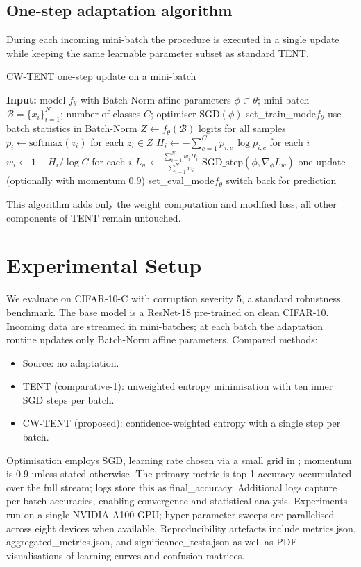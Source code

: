 \documentclass{article} %
\begin{document}
\subsection{One-step adaptation algorithm}
During each incoming mini-batch the procedure is executed in a single update while keeping the same learnable parameter subset as standard TENT.
\begin{algorithm}
\caption{CW-TENT one-step update on a mini-batch}
\begin{algorithmic}[1]
\State \textbf{Input:} model \(f_{\theta}\) with Batch-Norm affine parameters \(\phi\subset\theta\); mini-batch \(\mathcal{B}=\{x_i\}_{i=1}^{N}\); number of classes \(C\); optimiser \(\mathrm{SGD}(\phi)\)
\State set\_train\_mode\(f_{\theta}\) \Comment use batch statistics in Batch-Norm
\State \(Z \leftarrow f_{\theta}(\mathcal{B})\) \Comment logits for all samples
\State \(p_i \leftarrow \mathrm{softmax}(z_i)\) for each \(z_i\in Z\)
\State \(H_i \leftarrow -\sum_{c=1}^{C} p_{i,c}\,\log p_{i,c}\) for each \(i\)
\State \(w_i \leftarrow 1 - H_i/\log C\) for each \(i\)
\State \(L_w \leftarrow \frac{\sum_{i=1}^{N} w_i H_i}{\sum_{i=1}^{N} w_i}\)
\State \(\mathrm{SGD\_step}(\phi, \nabla_{\phi} L_w)\) \Comment one update (optionally with momentum 0.9)
\State set\_eval\_mode\(f_{\theta}\) \Comment switch back for prediction
\end{algorithmic}
\end{algorithm}
This algorithm adds only the weight computation and modified loss; all other components of TENT remain untouched.

\section{Experimental Setup}
\label{sec:experimental}
We evaluate on CIFAR-10-C with corruption severity 5, a standard robustness benchmark. The base model is a ResNet-18 pre-trained on clean CIFAR-10. Incoming data are streamed in mini-batches; at each batch the adaptation routine updates only Batch-Norm affine parameters.
Compared methods:
\begin{itemize}
  \item Source: no adaptation.
  \item TENT (comparative-1): unweighted entropy minimisation with ten inner SGD steps per batch.
  \item CW-TENT (proposed): confidence-weighted entropy with a single step per batch.
\end{itemize}
Optimisation employs SGD, learning rate chosen via a small grid in ; momentum is 0.9 unless stated otherwise. The primary metric is top-1 accuracy accumulated over the full stream; logs store this as final\_accuracy. Additional logs capture per-batch accuracies, enabling convergence and statistical analysis.
Experiments run on a single NVIDIA A100 GPU; hyper-parameter sweeps are parallelised across eight devices when available. Reproducibility artefacts include metrics.json, aggregated\_metrics.json, and significance\_tests.json as well as PDF visualisations of learning curves and confusion matrices.
\end{document}
